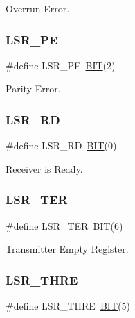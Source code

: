 Overrun Error. 

\hypertarget{group___serial_ga0ee28cdbc0917173f06cc39527452a8f}{}\label{group___serial_ga0ee28cdbc0917173f06cc39527452a8f} 
\subsubsection{\texorpdfstring{L\+S\+R\+\_\+\+PE}{LSR\_PE}}
{\footnotesize\ttfamily \#define L\+S\+R\+\_\+\+PE~\hyperlink{group___serial_ga3a8ea58898cb58fc96013383d39f482c}{B\+IT}(2)}



Parity Error. 

\hypertarget{group___serial_gaef6b74ebb13843a65360fd9150bfe60f}{}\label{group___serial_gaef6b74ebb13843a65360fd9150bfe60f} 
\subsubsection{\texorpdfstring{L\+S\+R\+\_\+\+RD}{LSR\_RD}}
{\footnotesize\ttfamily \#define L\+S\+R\+\_\+\+RD~\hyperlink{group___serial_ga3a8ea58898cb58fc96013383d39f482c}{B\+IT}(0)}



Receiver is Ready. 

\hypertarget{group___serial_ga6b9fdb38c6b844ba25a7dba0f024e20c}{}\label{group___serial_ga6b9fdb38c6b844ba25a7dba0f024e20c} 
\subsubsection{\texorpdfstring{L\+S\+R\+\_\+\+T\+ER}{LSR\_TER}}
{\footnotesize\ttfamily \#define L\+S\+R\+\_\+\+T\+ER~\hyperlink{group___serial_ga3a8ea58898cb58fc96013383d39f482c}{B\+IT}(6)}



Transmitter Empty Register. 

\hypertarget{group___serial_ga8c1a828f5fe296a9c1668cf3e72c00c1}{}\label{group___serial_ga8c1a828f5fe296a9c1668cf3e72c00c1} 
\subsubsection{\texorpdfstring{L\+S\+R\+\_\+\+T\+H\+RE}{LSR\_THRE}}
{\footnotesize\ttfamily \#define L\+S\+R\+\_\+\+T\+H\+RE~\hyperlink{group___serial_ga3a8ea58898cb58fc96013383d39f482c}{B\+IT}(5)}



